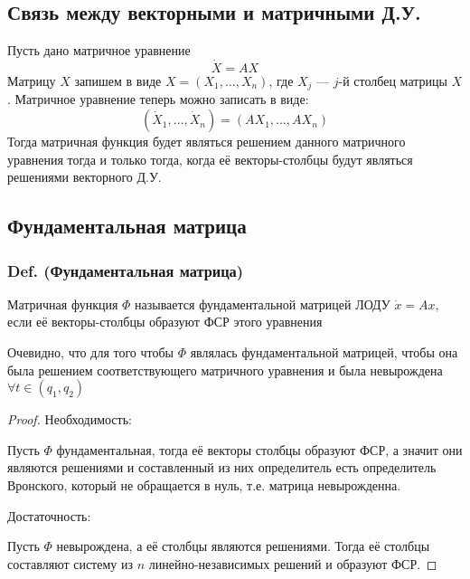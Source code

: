 \subsection{Связь между векторными и матричными
Д.У.}\label{ux441ux432ux44fux437ux44c-ux43cux435ux436ux434ux443-ux432ux435ux43aux442ux43eux440ux43dux44bux43cux438-ux438-ux43cux430ux442ux440ux438ux447ux43dux44bux43cux438-ux434.ux443.}

Пусть дано матричное уравнение \[ \dot X = A X \] Матрицу \(X\) запишем
в виде \(X = (X_1, \ldots, X_n)\), где \(X_j\) --- \(j\)-й столбец
матрицы \(X\). Матричное уравнение теперь можно записать в виде: \[
(\dot X_1, \ldots, \dot X_n) = (A X_1, \ldots, A X_n)
\] Тогда матричная функция будет являться решением данного матричного
уравнения тогда и только тогда, когда её векторы-столбцы будут являться
решениями векторного Д.У.

\subsection{Фундаментальная
матрица}\label{ux444ux443ux43dux434ux430ux43cux435ux43dux442ux430ux43bux44cux43dux430ux44f-ux43cux430ux442ux440ux438ux446ux430}

\subsubsection{Def. (Фундаментальная
матрица)}\label{def.-ux444ux443ux43dux434ux430ux43cux435ux43dux442ux430ux43bux44cux43dux430ux44f-ux43cux430ux442ux440ux438ux446ux430}

Матричная функция \(\Phi\) называется фундаментальной матрицей ЛОДУ
\(\dot x = A x\), если её векторы-столбцы образуют ФСР этого уравнения

Очевидно, что для того чтобы \(\Phi\) являлась фундаментальной матрицей,
чтобы она была решением соответствующего матричного уравнения и была
невырождена \(\forall t\in (q_1, q_2)\)

\begin{proof}
Необходимость:

Пусть $\Phi$ фундаментальная, тогда её векторы столбцы образуют ФСР,
  а значит они являются решениями и составленный из них определитель
  есть определитель Вронского, который не обращается в нуль,
  т.е. матрица невырожденна.

Достаточность:

Пусть $\Phi$ невырождена, а её столбцы являются решениями.
Тогда её столбцы составляют систему из $n$ линейно-независимых решений и образуют ФСР.
\end{proof}

